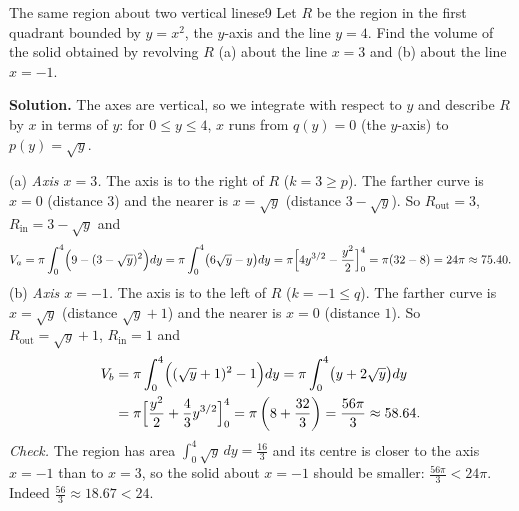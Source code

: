\documentclass[11pt]{article}
\begin{document}
\begin{exmp}{The same region about two vertical lines}{e9}
Let $R$ be the region in the first quadrant bounded by $y=x^2$, the $y$-axis and the line $y=4$. Find the volume of the solid obtained by revolving $R$ (a) about the line $x=3$ and (b) about the line $x=-1$.

\textbf{Solution.} The axes are vertical, so we integrate with respect to $y$ and describe $R$ by $x$ in terms of $y$: for $0\le y\le4$, $x$ runs from $q(y)=0$ (the $y$-axis) to $p(y)=\sqrt y$.

(a) \emph{Axis $x=3$.} The axis is to the right of $R$ ($k=3\ge p$). The farther curve is $x=0$ (distance $3$) and the nearer is $x=\sqrt y$ (distance $3-\sqrt y$). So $R_{\mathrm{out}}=3$, $R_{\mathrm{in}}=3-\sqrt y$ and
\[
V_a=\pi\int_0^4\Bigl(9-(3-\sqrt y)^2\Bigr)dy=\pi\int_0^4\bigl(6\sqrt y-y\bigr)dy=\pi\Bigl[4y^{3/2}-\frac{y^2}2\Bigr]_0^4=\pi(32-8)=24\pi\approx75.40 .
\]
(b) \emph{Axis $x=-1$.} The axis is to the left of $R$ ($k=-1\le q$). The farther curve is $x=\sqrt y$ (distance $\sqrt y+1$) and the nearer is $x=0$ (distance $1$). So $R_{\mathrm{out}}=\sqrt y+1$, $R_{\mathrm{in}}=1$ and
\[
\begin{aligned}V_b&=\pi\int_0^4\Bigl((\sqrt y+1)^2-1\Bigr)dy=\pi\int_0^4\bigl(y+2\sqrt y\bigr)dy\\ &=\pi\Bigl[\frac{y^2}2+\frac43y^{3/2}\Bigr]_0^4=\pi\left(8+\frac{32}3\right)=\frac{56\pi}3\approx58.64 .
\end{aligned}
\]
\emph{Check.} The region has area $\int_0^4\sqrt y\,dy=\frac{16}3$ and its centre is closer to the axis $x=-1$ than to $x=3$, so the solid about $x=-1$ should be smaller: $\frac{56\pi}3<24\pi$. Indeed $\frac{56}3\approx18.67<24$.


\end{exmp}
\end{document}
